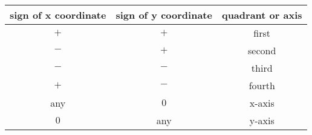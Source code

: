 \begin{tabular}[12pt]{ |c| c| c|} 
    \hline
    \textbf{sign of x coordinate} & \textbf{sign of y coordinate} & \textbf{quadrant or axis}\\ 
    \hline
    $ + $ & $ + $ & first\\
    \hline 
    $ - $ & $ + $ & second\\
    \hline
    $ - $ & $ - $ & third\\
    \hline   
    $ + $ & $ - $ & fourth\\
    \hline
    any  & $ 0 $ & x-axis\\
    \hline
    $ 0 $ &  any  & y-axis\\
    \hline
    \end{tabular}